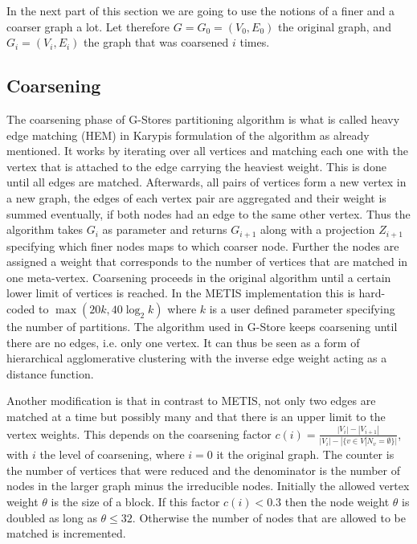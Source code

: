     
    In the next part of this section we are going to use the notions of a finer and a coarser graph a lot. Let therefore $G = G_0 = (V_0, E_0)$ the original graph, and $G_i = (V_i, E_i)$ the graph that was coarsened $i$ times.
    
    \subsection{Coarsening}\label{\positionnumber}
    The coarsening phase of G-Stores partitioning algorithm is what is called heavy edge matching (HEM) in Karypis formulation of the algorithm as already mentioned. 
    It works by iterating over all vertices and matching each one with the vertex that is attached to the edge carrying the heaviest weight.
    This is done until all edges are matched.
    Afterwards, all pairs of vertices form a new vertex in a new graph, the edges of each vertex pair are aggregated and their weight is summed eventually, if both nodes had an edge to the same other vertex. 
    Thus the algorithm takes $G_i$ as parameter and returns $G_{i+1}$ along with a projection $Z_{i+1}$ specifying which finer nodes maps to which coarser node.
    Further the nodes are assigned a weight that corresponds to the number of vertices that are matched in one meta-vertex.
    Coarsening proceeds in the original algorithm until a certain lower limit of vertices is reached.
    In the METIS implementation this is hard-coded to  $\max \left( 20k, 40 \log_2 k\right)$ where $k$ is a user defined parameter specifying the number of partitions.
    The algorithm used in G-Store keeps coarsening until there are no edges, i.e. only one vertex.
    It can thus be seen as a form of hierarchical agglomerative clustering with the inverse edge weight acting as a distance function.
    
    Another modification is that in contrast to METIS, not only two edges are matched at a time but possibly many and that there is an upper limit to the vertex weights. 
    This depends on the coarsening factor $c(i) = \frac{|V_i| - |V_{i+1}|}{|V_i| - |\{v \in V | N_v = \emptyset \}|}$, with $i$ the level of coarsening, where $i=0$ it the original graph.
    The counter is the number of vertices that were reduced and the denominator is the number of nodes in the larger graph minus the irreducible nodes.
    Initially the allowed vertex weight $\theta$ is the size of a block.
    If this factor $c(i) < 0.3$ then the node weight $\theta$ is doubled as long as $\theta \leq 32$.
    Otherwise the number of nodes that are allowed to be matched is incremented.
        

